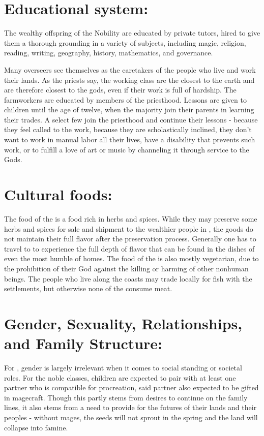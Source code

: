 \documentclass[blue]{GL2020}
\begin{document}
\section*{Educational system:}

The wealthy offspring of the Nobility are educated by private tutors, hired to give them a thorough grounding in a variety of subjects, including magic, religion, reading, writing, geography, history, mathematics, and governance.  %

Many overseers see themselves as the caretakers of the people who live and work their lands.  As the priests say, the working class are the closest to the earth and are therefore closest to the gods, even if their work is full of hardship.  The farmworkers are educated by members of the priesthood.  Lessons are given to children until the age of twelve, when the majority join their parents in learning their trades.  A select few join the priesthood and continue their lessons - because they feel called to the work, because they are scholastically inclined, they don't want to work in manual labor all their lives, have a disability that prevents such work, or to fulfill a love of art or music by channeling it through service to the Gods.

\section*{Cultural foods:}

The food of the \pFarm{} is a food rich in herbs and spices.  While they may preserve some herbs and spices for sale and shipment to the wealthier people in \pTech{}, the goods do not maintain their full flavor after the preservation process.  Generally one has to travel to \pFarm{} to experience the full depth of flavor that can be found in the dishes of even the most humble of homes.  The food of the \pFarmies{} is also mostly vegetarian, due to the prohibition of their God against the killing or harming of other nonhuman beings.  The people who live along the coasts may trade locally for fish with the \pShip{} settlements, but otherwise none of the \pFarm{} consume meat.

\section*{Gender, Sexuality, Relationships, and Family Structure:}

For \pFarm{}, gender is largely irrelevant when it comes to social standing or societal roles.  For the noble classes, children are expected to pair with at least one partner who is compatible for procreation, said partner also expected to be gifted in magecraft.  Though this partly stems from desires to continue on the family lines, it also stems from a need to provide for the futures of their lands and their peoples - without mages, the seeds will not sprout in the spring and the land will collapse into famine.   %
\end{document}
